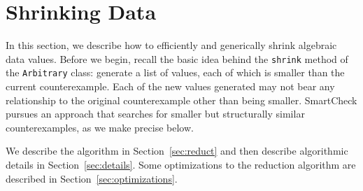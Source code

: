 \documentclass{sigplanconf}
\newcommand{\ttp}[1]{\texttt{#1}}
\begin{document}


\section{Shrinking Data}\label{sec:shrinking}
In this section, we describe how to efficiently and generically shrink algebraic
data values.  Before we begin, recall the basic idea behind the \ttp{shrink}
method of the \ttp{Arbitrary} class: generate a list of values, each of which is
smaller than the current counterexample.  Each of the new values generated
may not bear any relationship to the original counterexample other than being
smaller.  SmartCheck pursues an approach that searches for smaller but
structurally similar counterexamples, as we make precise below.

We describe the algorithm in Section~\ref{sec:reduct} and then describe
algorithmic details in Section~\ref{sec:details}.  Some optimizations to the
reduction algorithm are described in Section~\ref{sec:optimizations}.


\end{document}
